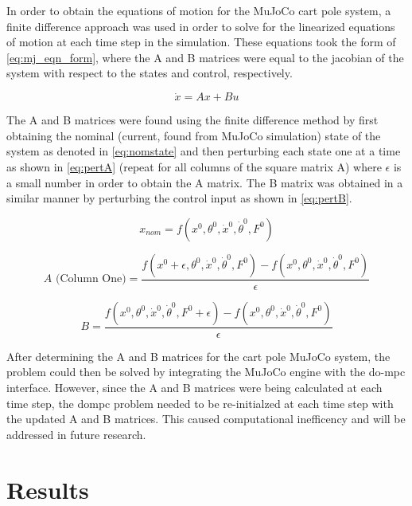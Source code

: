 \documentclass{./springer/svjour3}
\begin{document}
In order to obtain the equations of motion for the MuJoCo cart pole system, a finite difference approach was used in order to solve for the linearized equations of motion at 
each time step in the simulation. These equations took the form of \ref{eq:mj_eqn_form}, where the A and B matrices were equal to the jacobian of the system 
with respect to the states and 
control, respectively.

\begin{equation}
  \dot{x} = Ax + Bu
  \label{eq:mj_eqn_form}
\end{equation}

The A and B matrices were found using the finite difference method by first obtaining the nominal (current, found from MuJoCo simulation)
state of the system as denoted in \ref{eq:nomstate}
and then perturbing each state one at a time as shown in \ref{eq:pertA} (repeat for all columns of the square matrix A) where $\epsilon$
is a small number in order to obtain the A matrix. The B matrix was 
obtained in a similar manner by perturbing the control input as shown in \ref{eq:pertB}.

\begin{equation}
  x_{nom} = f(x^0, \theta^0, \dot{x}^0, \dot{\theta}^0, F^0)
  \label{eq:nomstate}
\end{equation}

\begin{equation}
  A \text{ (Column One)} =\frac{ f(x^0 + \epsilon, \theta^0, \dot{x}^0, \dot{\theta}^0, F^0) - f(x^0, \theta^0, \dot{x}^0, \dot{\theta}^0, F^0)}{\epsilon}
  \label{eq:pertA}
\end{equation}

\begin{equation}
  B =\frac{ f(x^0, \theta^0, \dot{x}^0, \dot{\theta}^0, F^0 + \epsilon) - f(x^0, \theta^0, \dot{x}^0, \dot{\theta}^0, F^0)}{\epsilon}
  \label{eq:pertB}
\end{equation}

After determining the A and B matrices for the cart pole MuJoCo system, the problem could then be solved by integrating the MuJoCo engine with the do-mpc interface.
However, since the A and B matrices were being calculated at each time step, the dompc problem needed to be re-initialzed at each time step with the updated A and B matrices.
This caused computational inefficency and will be addressed in future research.

\section{Results}
\end{document}
